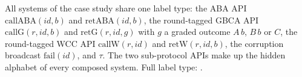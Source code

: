 \begin{definition}
  \label{def:aba-labels}
  \leanok
  All systems of the case study share one label type: the ABA API $\mathrm{callABA}(id,b)$ and $\mathrm{retABA}(id,b)$, the round-tagged GBCA API $\mathrm{callG}(r,id,b)$ and $\mathrm{retG}(r,id,g)$ with $g$ a graded outcome $A\,b$, $B\,b$ or $C$, the round-tagged WCC API $\mathrm{callW}(r,id)$ and $\mathrm{retW}(r,id,b)$, the corruption broadcast $\mathrm{fail}(id)$, and $\tau$.
  The two sub-protocol APIs make up the hidden alphabet of every composed system.
  Full label type: .
\end{definition}
